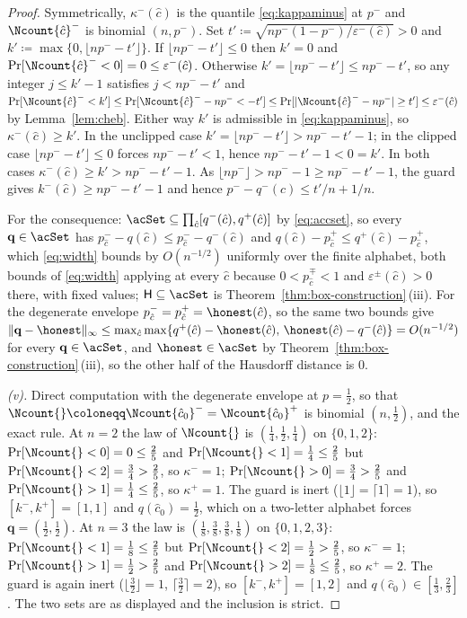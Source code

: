 \begin{proof}
Symmetrically, $\kappa^{-}(\hat c)$ is the quantile \eqref{eq:kappaminus} at
$p^{-}$ and $\Ncount{\hat c}^{-}$ is binomial $(n,p^{-})$. Set
$t'\coloneqq\sqrt{np^{-}(1-p^{-})/\varepsilon^{-}(\hat c)}>0$ and
$k'\coloneqq\max\{0,\lfloor np^{-}-t'\rfloor\}$. If $\lfloor np^{-}-t'\rfloor
\le0$ then $k'=0$ and $\Pr[\Ncount{\hat c}^{-}<0]=0\le\varepsilon^{-}(\hat
c)$. Otherwise $k'=\lfloor np^{-}-t'\rfloor\le np^{-}-t'$, so any integer
$j\le k'-1$ satisfies $j<np^{-}-t'$ and
$\Pr[\Ncount{\hat c}^{-}<k']\le\Pr[\Ncount{\hat c}^{-}-np^{-}<-t']\le
\Pr[|\Ncount{\hat c}^{-}-np^{-}|\ge t']\le\varepsilon^{-}(\hat c)$ by
Lemma~\ref{lem:cheb}. Either way $k'$ is admissible in
\eqref{eq:kappaminus}, so $\kappa^{-}(\hat c)\ge k'$. In the unclipped case
$k'=\lfloor np^{-}-t'\rfloor>np^{-}-t'-1$; in the clipped case
$\lfloor np^{-}-t'\rfloor\le0$ forces $np^{-}-t'<1$, hence $np^{-}-t'-1<0=k'$.
In both cases $\kappa^{-}(\hat c)\ge k'>np^{-}-t'-1$. As
$\lfloor np^{-}\rfloor>np^{-}-1\ge np^{-}-t'-1$, the guard gives
$k^{-}(\hat c)\ge np^{-}-t'-1$ and hence $p^{-}-q^{-}(\hat c)\le t'/n+1/n$.

For the consequence: $\acSet\subseteq\prod_{\hat c}[q^{-}(\hat
c),q^{+}(\hat c)]$ by \eqref{eq:accset}, so every $\mathbf{q}\in\acSet$ has
$p^{-}_{\hat c}-q(\hat c)\le p^{-}_{\hat c}-q^{-}(\hat c)$ and
$q(\hat c)-p^{+}_{\hat c}\le q^{+}(\hat c)-p^{+}_{\hat c}$, which
\eqref{eq:width} bounds by $O(n^{-1/2})$ uniformly
over the finite alphabet, both bounds of \eqref{eq:width} applying at every
$\hat c$ because $0<p^{\mp}_{\hat c}<1$ and $\varepsilon^{\pm}(\hat c)>0$
there, with fixed values; $\mathsf{H}\subseteq\acSet$ is
Theorem~\ref{thm:box-construction}\,(iii). For the degenerate envelope
$p^{-}_{\hat c}=p^{+}_{\hat c}=\honest(\hat c)$, so the same two bounds give
$\|\mathbf{q}-\honest\|_{\infty}\le\max_{\hat c}\max\{q^{+}(\hat
c)-\honest(\hat c),\,\honest(\hat c)-q^{-}(\hat c)\}=O(n^{-1/2})$ for every
$\mathbf{q}\in\acSet$, and $\honest\in\acSet$ by Theorem~\ref{thm:box-construction}\,(iii),
so the other half of the Hausdorff distance is $0$.

\emph{(v).} Direct computation with the degenerate envelope at $p=\tfrac12$,
so that $\Ncount{}\coloneqq\Ncount{\hat c_0}^{-}=\Ncount{\hat c_0}^{+}$ is
binomial $(n,\tfrac12)$, and the exact rule. At
$n=2$ the law of $\Ncount{}$ is $(\tfrac14,\tfrac12,\tfrac14)$ on
$\{0,1,2\}$: $\Pr[\Ncount{}<0]=0\le\tfrac25$ and
$\Pr[\Ncount{}<1]=\tfrac14\le\tfrac25$ but
$\Pr[\Ncount{}<2]=\tfrac34>\tfrac25$, so $\kappa^{-}=1$;
$\Pr[\Ncount{}>0]=\tfrac34>\tfrac25$ and $\Pr[\Ncount{}>1]=\tfrac14\le\tfrac25$,
so $\kappa^{+}=1$. The guard is inert ($\lfloor1\rfloor=\lceil1\rceil=1$), so
$[k^{-},k^{+}]=[1,1]$ and $q(\hat c_0)=\tfrac12$, which on a two-letter
alphabet forces $\mathbf{q}=(\tfrac12,\tfrac12)$. At $n=3$ the law is
$(\tfrac18,\tfrac38,\tfrac38,\tfrac18)$ on $\{0,1,2,3\}$:
$\Pr[\Ncount{}<1]=\tfrac18\le\tfrac25$ but
$\Pr[\Ncount{}<2]=\tfrac12>\tfrac25$, so $\kappa^{-}=1$;
$\Pr[\Ncount{}>1]=\tfrac12>\tfrac25$ and
$\Pr[\Ncount{}>2]=\tfrac18\le\tfrac25$, so $\kappa^{+}=2$. The guard is again
inert ($\lfloor\tfrac32\rfloor=1$, $\lceil\tfrac32\rceil=2$), so
$[k^{-},k^{+}]=[1,2]$ and $q(\hat c_0)\in[\tfrac13,\tfrac23]$. The two sets are
as displayed and the inclusion is strict.


\end{proof}
